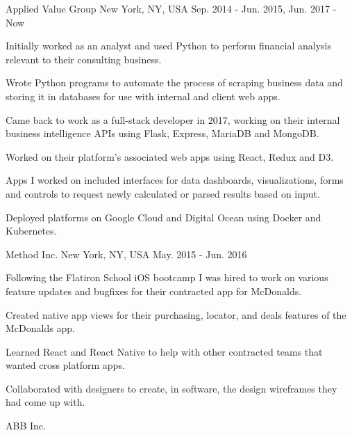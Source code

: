 \begin{cventries}
        {Applied Value Group}
        {New York, NY, USA}
        {Sep. 2014 - Jun. 2015, Jun. 2017 - Now}
        {\begin{cvitems}
            \item{Initially worked as an analyst and used Python to perform financial analysis relevant to their consulting business.}
            \item{Wrote Python programs to automate the process of scraping business data and storing it in databases for use with internal and client web apps.}
            \item{Came back to work as a full-stack developer in 2017, working on their internal business intelligence APIs using Flask, Express, MariaDB and MongoDB.}
            \item{Worked on their platform's associated web apps using React, Redux and D3.}
            \item{Apps I worked on included interfaces for data dashboards, visualizations, forms and controls to request newly calculated or parsed results based on input.}
            \item{Deployed platforms on Google Cloud and Digital Ocean using Docker and Kubernetes.}
        \end{cvitems}}
        {Method Inc.}
        {New York, NY, USA}
        {May. 2015 - Jun. 2016}
        {\begin{cvitems}
            \item{Following the Flatiron School iOS bootcamp I was hired to work on various feature updates and bugfixes for their contracted app for McDonalds.}
            \item{Created native app views for their purchasing, locator, and deals features of the McDonalds app.}
            \item{Learned React and React Native to help with other contracted teams that wanted cross platform apps.}
            \item{Collaborated with designers to create, in software, the design wireframes they had come up with.}
        \end{cvitems}}
        {ABB Inc.}

\end{cventries}

